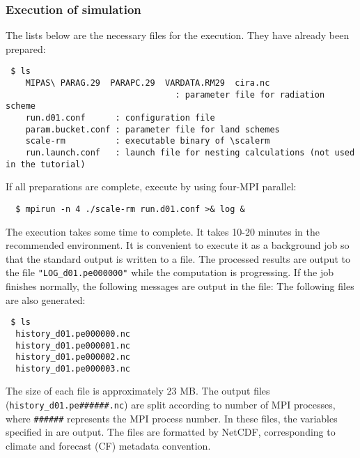 \subsubsection{Execution of simulation}

The lists below are the necessary files for the execution. They have already been prepared:
\begin{verbatim}
 $ ls
    MIPAS\ PARAG.29  PARAPC.29  VARDATA.RM29  cira.nc
                                  : parameter file for radiation scheme
    run.d01.conf      : configuration file
    param.bucket.conf : parameter file for land schemes
    scale-rm          : executable binary of \scalerm
    run.launch.conf   : launch file for nesting calculations (not used in the tutorial)
\end{verbatim}
If all preparations are complete, execute \scalerm by using four-MPI parallel:
\begin{verbatim}
  $ mpirun -n 4 ./scale-rm run.d01.conf >& log &
\end{verbatim}
The execution takes some time to complete. It takes 10-20 minutes in the recommended environment. It is convenient to execute it as a background job  so that the standard output is written to a file. The processed results are output to the file \verb|"LOG_d01.pe000000"| while the computation is progressing.  If the job finishes normally, the following messages are output in the file:
The following files are also generated:
\begin{verbatim}
 $ ls
  history_d01.pe000000.nc
  history_d01.pe000001.nc
  history_d01.pe000002.nc
  history_d01.pe000003.nc
\end{verbatim}
The size of each file is approximately 23 MB. 
The output files (\verb|history_d01.pe######.nc|) are 
split according to number of MPI processes,
where \verb|######| represents the MPI process number.
In these files, the variables specified in  are output.
The files are formatted by NetCDF,
corresponding to climate and forecast (CF) metadata convention.




